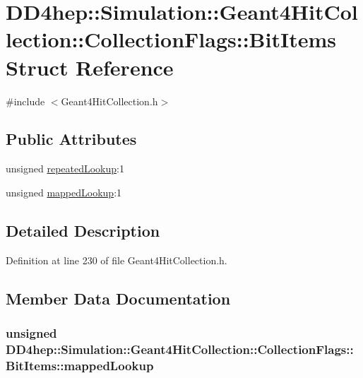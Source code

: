\hypertarget{struct_d_d4hep_1_1_simulation_1_1_geant4_hit_collection_1_1_collection_flags_1_1_bit_items}{
\section{DD4hep::Simulation::Geant4HitCollection::CollectionFlags::BitItems Struct Reference}
\label{struct_d_d4hep_1_1_simulation_1_1_geant4_hit_collection_1_1_collection_flags_1_1_bit_items}
}


{\ttfamily \#include $<$Geant4HitCollection.h$>$}\subsection*{Public Attributes}
\begin{DoxyCompactItemize}
\item 
unsigned \hyperlink{struct_d_d4hep_1_1_simulation_1_1_geant4_hit_collection_1_1_collection_flags_1_1_bit_items_af334712a202c01ad71ea6578067ef3f7}{repeatedLookup}:1
\item 
unsigned \hyperlink{struct_d_d4hep_1_1_simulation_1_1_geant4_hit_collection_1_1_collection_flags_1_1_bit_items_acf2a99b0be08d73a82ec6ac4d5841686}{mappedLookup}:1
\end{DoxyCompactItemize}


\subsection{Detailed Description}


Definition at line 230 of file Geant4HitCollection.h.

\subsection{Member Data Documentation}
\hypertarget{struct_d_d4hep_1_1_simulation_1_1_geant4_hit_collection_1_1_collection_flags_1_1_bit_items_acf2a99b0be08d73a82ec6ac4d5841686}{
\subsubsection[{mappedLookup}]{\setlength{\rightskip}{0pt plus 5cm}unsigned {\bf DD4hep::Simulation::Geant4HitCollection::CollectionFlags::BitItems::mappedLookup}}}
\label{struct_d_d4hep_1_1_simulation_1_1_geant4_hit_collection_1_1_collection_flags_1_1_bit_items_acf2a99b0be08d73a82ec6ac4d5841686}



